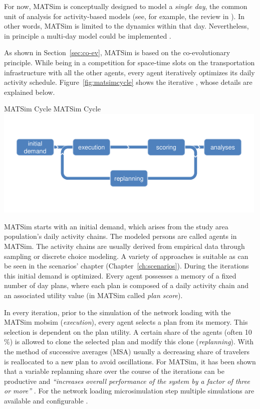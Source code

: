 For now, MATSim is conceptually designed to model a \emph{single day}, the common unit of analysis for activity-based models (see, for example, the review in \citet[][]{Bowman_TEC_2009_1}). In other words, MATSim is limited to the dynamics within that day. Nevertheless, in principle a multi-day model could be implemented \citep[][]{HorniEtAl_TechRep_IVT_2012_a}.

As shown in Section~\ref{sec:co-ev}, MATSim is based on the co-evolutionary principle. While being in a competition for space-time slots on the transportation infrastructure with all the other agents, every agent iteratively optimizes its daily \gls{activity} schedule. Figure~\ref{fig:matsimcycle} shows the iterative , whose details are explained below. 

\createfigure%
{MATSim Cycle}%
{MATSim Cycle}%
{\label{fig:matsimcycle}}%
{\includegraphics[width=0.99\textwidth, angle=0]{figures/matsimcycle.pdf}}%
{}

MATSim starts with an initial demand, which arises from the study area population's daily activity chains. The modeled persons are called agents in MATSim. The activity chains are usually derived from empirical data through sampling or discrete choice modeling. A variety of approaches is suitable as can be seen in the scenarios' chapter (Chapter~\ref{ch:scenarios}). During the iterations this initial demand is optimized. Every agent possesses a memory of a fixed number of day plans, where each \gls{plan} is composed of a daily activity chain and an associated utility value (in MATSim called \emph{plan \gls{score}}).

In every iteration, prior to the simulation of the network loading with the MATSim \gls{mobsim} \citep[e.g.,][]{Cetin_PhDThesis_2005} (\emph{execution}), every agent selects a plan from its memory. This selection is dependent on the plan \gls{utility}. A certain share of the agents 
(often 10$\%$) is allowed to clone the selected plan and modify this clone (\emph{\gls{replanning}}). With the method of successive averages (MSA) usually a decreasing share of travelers is reallocated to a new plan to avoid oscillations. For MATSim, it has been shown that a variable replanning share over the course of the iterations can be productive and \emph{``increases overall performance of the system by a factor of three or more''} \citep[][p.7f]{CharyparEtAl_IATBR_2006}. For the network loading microsimulation step multiple simulations are available and configurable \citep[][p.10f]{HorniEtAl_TechRep_IVT_2011_a}. 

